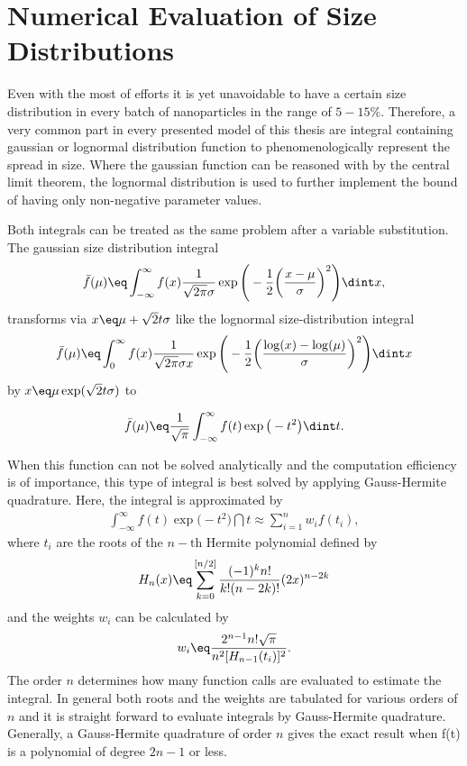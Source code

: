 \documentclass[\main/dresen_thesis.tex]{subfiles}
\begin{document}
\chapter{Numerical Evaluation of Size Distributions}\label{ch:appendix:sizeDist}
Even with the most of efforts it is yet unavoidable to have a certain size distribution in every batch of nanoparticles in the range of $5 - 15 \%$.
Therefore, a very common part in every presented model of this thesis are integral containing gaussian or lognormal distribution function to phenomenologically represent the spread in size. Where the gaussian function can be reasoned with by the central limit theorem, the lognormal distribution is used to further implement the bound of having only non-negative parameter values.

Both integrals can be treated as the same problem after a variable substitution. 
The gaussian size distribution integral
\begin{align}
\bar{f}(\mu) \eq \int_{-\infty}^\infty f(x) \frac{1}{\sqrt{2\pi} \sigma} \exp \Bigg(- \frac{1}{2} \bigg(\frac{x-\mu}{\sigma}\bigg)^2 \Bigg) \dint x,
\end{align}
transforms via $x \eq \mu + \sqrt{2} t \sigma$ like the lognormal size-distribution integral
\begin{align}
\bar{f}(\mu) \eq \int_{0}^\infty f(x) \frac{1}{\sqrt{2\pi} \sigma x} \exp \Bigg(- \frac{1}{2} \bigg(\frac{\log(x)-\log(\mu)}{\sigma}\bigg)^2 \Bigg) \dint x
\end{align}
by $x \eq \mu \exp(\sqrt{2} t \sigma)$ to

\begin{align}
\bar{f}(\mu) \eq \frac{1}{\sqrt{\pi}} \int_{-\infty}^\infty f(t) \exp \big(- t^2 \big) \dint t.
\end{align}

When this function can not be solved analytically and the computation efficiency is of importance, this type of integral is best solved by applying Gauss-Hermite quadrature. Here, the integral is approximated by
\begin{align}
\int_{-\infty}^\infty f(t) \exp \big(- t^2 \big) \dint t \approx \sum_{i=1}^{n} w_i f(t_i),
\end{align}
where $t_{i}$ are the roots of the $n-\mathrm{th}$ Hermite polynomial defined by
\begin{align}
H_n (x) \eq \sum_{k=0}^{[n/2]} \frac{(-1)^k n!}{k! (n-2k)!} (2x)^{n-2k}
\end{align}
and the weights $w_{i}$ can be calculated by
\begin{align}
w_i \eq \frac{2^{n-1} n! \sqrt{\pi}}{n^2 [H_{n-1}(t_i)]^2}.
\end{align}
The order $n$ determines how many function calls are evaluated to estimate the integral. 
In general both roots and the weights are tabulated for various orders of $n$ and it is straight forward to evaluate integrals by Gauss-Hermite quadrature. 
Generally, a Gauss-Hermite quadrature of order $n$ gives the exact result when f(t) is a polynomial of degree $2n-1$ or less.
\end{document}

